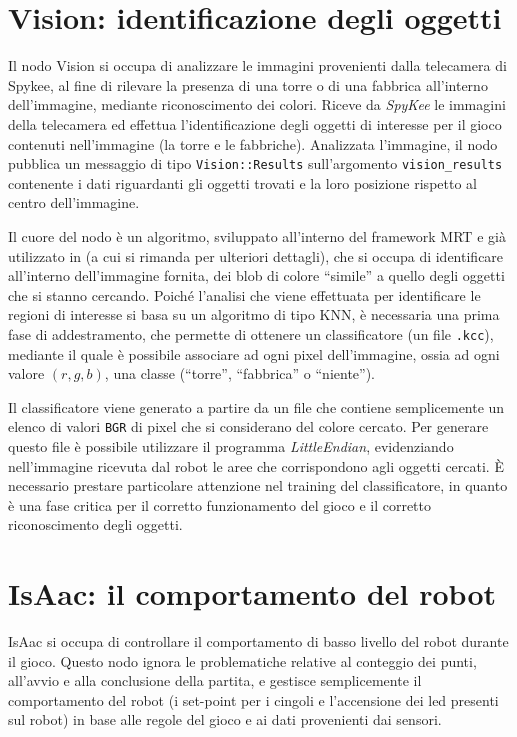 \section{Vision: identificazione degli oggetti}

Il nodo Vision si occupa di analizzare le immagini provenienti dalla telecamera di Spykee, al fine di rilevare la presenza di una torre o di una fabbrica all'interno dell'immagine, mediante riconoscimento dei colori. Riceve da \emph{SpyKee} le immagini della telecamera ed effettua l'identificazione degli oggetti di interesse per il gioco contenuti nell'immagine (la torre e le fabbriche). Analizzata l'immagine, il nodo pubblica un messaggio di tipo \verb|Vision::Results| sull'argomento \verb|vision_results| contenente i dati riguardanti gli oggetti trovati e la loro posizione rispetto al centro dell'immagine. %

Il cuore del nodo è un algoritmo, sviluppato all'interno del framework MRT \cite{mrt} e già utilizzato in \cite{docmandelli} (a cui si rimanda per ulteriori dettagli), che si occupa di identificare all'interno dell'immagine fornita, dei blob di colore ``simile'' a quello degli oggetti che si stanno cercando. Poiché l'analisi che viene effettuata per identificare le regioni di interesse si basa su un algoritmo di tipo KNN, è necessaria una prima fase di addestramento, che permette di ottenere un classificatore (un file \verb|.kcc|), mediante il quale è possibile associare ad ogni pixel dell'immagine, ossia ad ogni valore $(r,g,b)$, una classe (``torre'', ``fabbrica'' o ``niente'').

Il classificatore viene generato a partire da un file che contiene semplicemente un elenco di valori \verb|BGR| di pixel che si considerano del colore cercato. Per generare questo file è possibile utilizzare il programma \emph{LittleEndian}, evidenziando nell'immagine ricevuta dal robot le aree che corrispondono agli oggetti cercati. È necessario prestare particolare attenzione nel training del classificatore, in quanto è una fase critica per il corretto funzionamento del gioco e il corretto riconoscimento degli oggetti. %

\section{IsAac: il comportamento del robot}
IsAac si occupa di controllare il comportamento di basso livello del robot durante il gioco. Questo nodo ignora le problematiche relative al conteggio dei punti, all'avvio e alla conclusione della partita, e gestisce semplicemente il comportamento del robot (i set-point per i cingoli e l'accensione dei led presenti sul robot) in base alle regole del gioco e ai dati provenienti dai sensori. 

